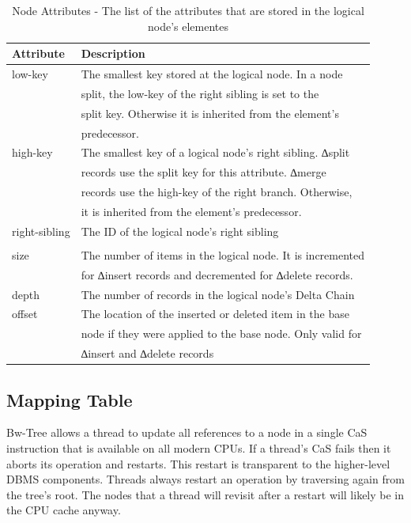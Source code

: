 \documentclass[11pt]{article}
\begin{document}
\begin{table}[htbp]
\caption{\label{tab1}Node Attributes - The list of the attributes that are stored in the logical node's elementes}
\centering
\begin{tabular}{|l|l|}
\hline
Attribute & Description \\
\hline
low-key & The smallest key stored at the logical node. In a node \\
 & split, the low-key of the right sibling is set to the \\
 & split key. Otherwise it is inherited from the element's \\
 & predecessor. \\
\hline
high-key & The smallest key of a logical node's right sibling. ∆split \\
 & records use the split key for this attribute. ∆merge \\
 & records use the high-key of the right branch. Otherwise, \\
 & it is inherited from the element's predecessor. \\
\hline
right-sibling & The ID of the logical node's right sibling \\
 & \\
\hline
size & The number of items in the logical node. It is incremented \\
 & for ∆insert records and decremented for ∆delete records. \\
\hline
depth & The number of records in the logical node's Delta Chain \\
\hline
offset & The location of the inserted or deleted item in the base \\
 & node if they were applied to the base node. Only valid for \\
 & ∆insert and ∆delete records \\
\hline
\end{tabular}
\end{table}
\subsection{Mapping Table}
\label{sec:org2f765db}
Bw-Tree allows a thread to update all references to a node in a single CaS instruction that is
available on all modern CPUs. If a thread's CaS fails then it aborts its operation and restarts. This
restart is transparent to the higher-level DBMS components. Threads always restart an operation by
traversing again from the tree's root. The nodes that a thread will revisit after a restart will
likely be in the CPU cache anyway.
\end{document}
